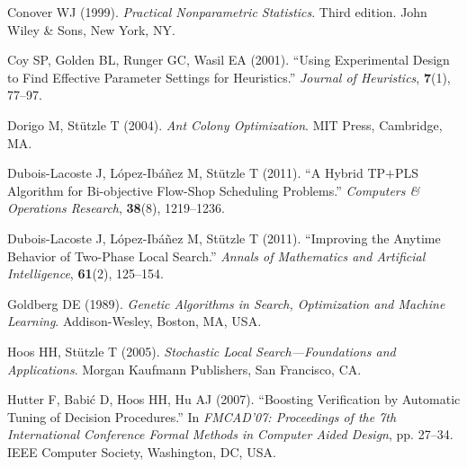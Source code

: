 \documentclass[article,a4paper,nojss,notitle]{jss}
\begin{document}
\begin{thebibliography}{34}
Conover WJ (1999).
\newblock \emph{Practical Nonparametric Statistics}.
\newblock Third edition. John Wiley \& Sons, New York, NY.

Coy SP, Golden BL, Runger GC, Wasil EA (2001).
\newblock \enquote{Using Experimental Design to Find Effective Parameter
  Settings for Heuristics.}
\newblock \emph{Journal of Heuristics}, \textbf{7}(1), 77--97.

Dorigo M, St{\"u}tzle T (2004).
\newblock \emph{Ant Colony Optimization}.
\newblock MIT Press, Cambridge, MA.

Dubois-Lacoste J, L{\'o}pez-Ib{\'a}{\~n}ez M, St{\"u}tzle T
  (2011{}).
\newblock \enquote{A Hybrid {TP$+$PLS} Algorithm for Bi-objective Flow-Shop
  Scheduling Problems.}
\newblock \emph{Computers \& Operations Research}, \textbf{38}(8), 1219--1236.

Dubois-Lacoste J, L{\'o}pez-Ib{\'a}{\~n}ez M, St{\"u}tzle T
  (2011{}).
\newblock \enquote{Improving the Anytime Behavior of Two-Phase Local Search.}
\newblock \emph{Annals of Mathematics and Artificial Intelligence},
  \textbf{61}(2), 125--154.

Goldberg DE (1989).
\newblock \emph{Genetic Algorithms in Search, Optimization and Machine
  Learning}.
\newblock Addison-Wesley, Boston, MA, USA.

Hoos HH, St{\"u}tzle T (2005).
\newblock \emph{Stochastic Local Search---Foundations and Applications}.
\newblock Morgan Kaufmann Publishers, San Francisco, CA.

Hutter F, Babi{\'c} D, Hoos HH, Hu AJ (2007).
\newblock \enquote{Boosting Verification by Automatic Tuning of Decision
  Procedures.}
\newblock In \emph{FMCAD'07: Proceedings of the 7th International Conference
  Formal Methods in Computer Aided Design}, pp. 27--34. IEEE Computer Society,
  Washington, DC, USA.


\end{thebibliography}
\end{document}
